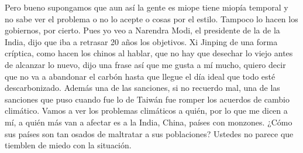 Pero bueno supongamos que aun así la gente es miope tiene miopía temporal y no sabe ver el problema o no lo acepte o cosas por el estilo. Tampoco lo hacen los gobiernos, por cierto. Pues yo veo a Narendra Modi, el presidente de la de la India, dijo que iba a retrasar 20 años los objetivos. Xi Jinping de una forma críptica, como hacen los chinos al hablar, que no hay que desechar lo viejo antes de alcanzar lo nuevo, dijo una frase así que me gusta a mí mucho, quiero decir que no va a abandonar el carbón hasta que llegue el día ideal que todo esté descarbonizado. Además una de las sanciones, si no recuerdo mal, una de las sanciones que puso cuando fue lo de Taiwán fue romper los acuerdos de cambio climático. Vamos a ver los problemas climáticos a quién, por lo que me dicen a mí, a quién más van a afectar es a la India, China, países con monzones. ¿Cómo sus países son tan osados de maltratar a sus poblaciones? Ustedes no parece que tiemblen de miedo con la situación. 

